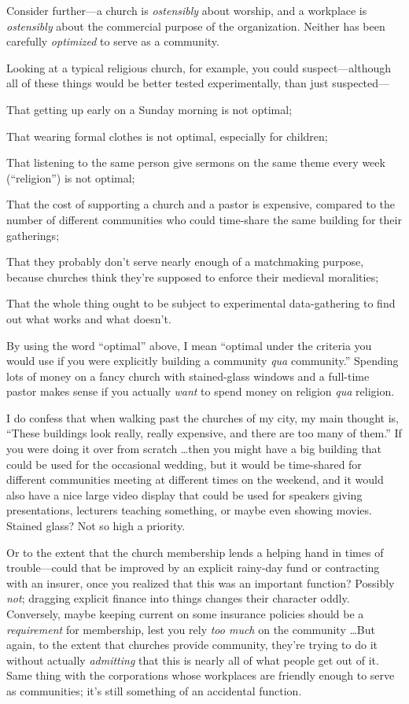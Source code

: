 {
 Consider further---a church is \textit{ostensibly} about worship,
and a workplace is \textit{ostensibly} about the commercial purpose of
the organization. Neither has been carefully \textit{optimized} to
serve as a community.}

{
 Looking at a typical religious church, for example, you could
suspect---although all of these things would be better tested
experimentally, than just suspected---}

{
 That getting up early on a Sunday morning is not optimal;}

{
 That wearing formal clothes is not optimal, especially for
children;}

{
 That listening to the same person give sermons on the same theme
every week (``religion'') is not
optimal;}

{
 That the cost of supporting a church and a pastor is expensive,
compared to the number of different communities who could time-share
the same building for their gatherings;}

{
 That they probably don't serve nearly enough of a
matchmaking purpose, because churches think they're
supposed to enforce their medieval moralities;}

{
 That the whole thing ought to be subject to experimental
data-gathering to find out what works and what
doesn't.}

{
 By using the word ``optimal''
above, I mean ``optimal under the criteria you would
use if you were explicitly building a community \textit{qua}
community.'' Spending lots of money on a fancy church
with stained-glass windows and a full-time pastor makes sense if you
actually \textit{want} to spend money on religion \textit{qua}
religion.}

{
 I do confess that when walking past the churches of my city, my
main thought is, ``These buildings look really, really
expensive, and there are too many of them.'' If you
were doing it over from scratch \ldots then you might have a big
building that could be used for the occasional wedding, but it would be
time-shared for different communities meeting at different times on the
weekend, and it would also have a nice large video display that could
be used for speakers giving presentations, lecturers teaching
something, or maybe even showing movies. Stained glass? Not so high a
priority.}

{
 Or to the extent that the church membership lends a helping hand
in times of trouble---could that be improved by an explicit rainy-day
fund or contracting with an insurer, once you realized that this was an
important function? Possibly \textit{not}; dragging explicit finance
into things changes their character oddly. Conversely, maybe keeping
current on some insurance policies should be a \textit{requirement} for
membership, lest you rely \textit{too much} on the community \ldots But
again, to the extent that churches provide community,
they're trying to do it without actually
\textit{admitting} that this is nearly all of what people get out of
it. Same thing with the corporations whose workplaces are friendly
enough to serve as communities; it's still something of
an accidental function.}

